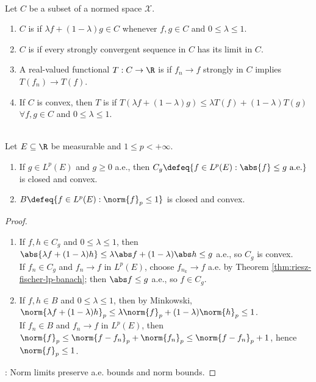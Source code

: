 \begin{definition} \label{def:closed-convex-sets-and-convex-functionals} \\
Let $C$ be a subset of a normed space $\mathcal{X}$.
\begin{enumerate}[label=(\roman*)]
\setlength{\itemsep}{0pt}
\item $C$ is  if $\lambda f+(1-\lambda)g\in C$ whenever $f,g\in C$ and $0\leq\lambda\leq1$.
\item $C$ is  if every strongly convergent sequence in $C$ has its limit in $C$.
\item A real-valued functional $T:C\to\R$ is  if $f_n\to f$ strongly in $C$ implies $T(f_n)\to T(f)$.
\item If $C$ is convex, then $T$ is  if
$T(\lambda f+(1-\lambda)g)\leq\lambda T(f)+(1-\lambda)T(g)$
$\forall f,g\in C$ and $0\leq\lambda\leq1$.
\end{enumerate}
\end{definition}

\begin{example} \label{ex:lp-closed-convex-basic-sets} \\
Let $E\subseteq\R$ be measurable and $1\leq p<+\infty$.
\begin{enumerate}[label=(\roman*)]
\setlength{\itemsep}{0pt}
\item If $g\in L^p(E)$ and $g\geq0$ a.e., then $C_g\defeq\{f\in L^p(E):\abs{f}\leq g\ \text{a.e.}\}$ is closed and convex.
\item $B\defeq\{f\in L^p(E):\norm{f}_p\leq1\}$ is closed and convex.
\end{enumerate}
\begin{proof}
\begin{enumerate}[label=(\roman*)]
\setlength{\itemsep}{0pt}
\item If $f,h\in C_g$ and $0\leq\lambda\leq1$, then $\abs{\lambda f+(1-\lambda)h}\leq\lambda\abs f+(1-\lambda)\abs h\leq g$ a.e., so $C_g$ is convex.\\
If $f_n\in C_g$ and $f_n\to f$ in $L^p(E)$, choose $f_{n_k}\to f$ a.e. by Theorem \ref{thm:riesz-fischer-lp-banach}; then $\abs f\leq g$ a.e., so $f\in C_g$.
\item If $f,h\in B$ and $0\leq\lambda\leq1$, then by Minkowski, $\norm{\lambda f+(1-\lambda)h}_p\leq\lambda\norm{f}_p+(1-\lambda)\norm{h}_p\leq1$.\\
If $f_n\in B$ and $f_n\to f$ in $L^p(E)$, then $\norm{f}_p\leq\norm{f-f_n}_p+\norm{f_n}_p\leq\norm{f-f_n}_p+1$, hence $\norm{f}_p\leq1$.
\end{enumerate}
: Norm limits preserve a.e. bounds and norm bounds.
\end{proof}
\end{example}

